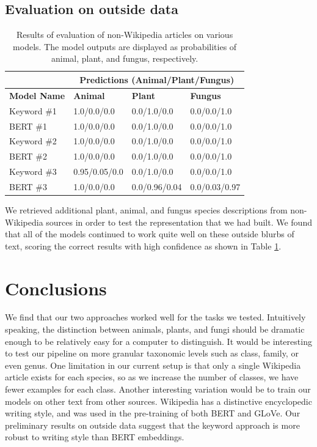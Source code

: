 \documentclass[10pt,twocolumn,letterpaper]{article}
\begin{document}
\subsection{Evaluation on outside data}

\begin{table}
    \centering
    \begin{tabular}{|l|l|l|l|}
    \hline
    \: & \multicolumn{3}{c|}{\bfseries Predictions (Animal/Plant/Fungus)} \\ \hline
    \bfseries Model Name &
    \bfseries Animal &
    \bfseries Plant &
    \bfseries Fungus \\ \hline
Keyword \#1 &
1.0/0.0/0.0 &
0.0/1.0/0.0 &
0.0/0.0/1.0 \\ \hline
BERT \#1 &
1.0/0.0/0.0 &
0.0/1.0/0.0 &
0.0/0.0/1.0 \\ \hline
Keyword \#2 &
1.0/0.0/0.0 &
0.0/1.0/0.0 &
0.0/0.0/1.0 \\ \hline
BERT \#2 &
1.0/0.0/0.0 &
0.0/1.0/0.0 &
0.0/0.0/1.0 \\ \hline
Keyword \#3 &
0.95/0.05/0.0 &
0.0/1.0/0.0 &
0.0/0.0/1.0 \\ \hline
BERT \#3 &
1.0/0.0/0.0 &
0.0/0.96/0.04 &
0.0/0.03/0.97 \\ \hline

    \end{tabular}
    \caption{Results of evaluation of non-Wikipedia articles on various models. The model outputs are displayed as probabilities of animal, plant, and fungus, respectively.}
    \label{fig:evaluation}
\end{table}

We retrieved additional plant, animal, and fungus species descriptions from non-Wikipedia sources in order to test the representation that we had built. We found that all of the models continued to work quite well on these outside blurbs of text, scoring the correct results with high confidence as shown in Table \ref{fig:evaluation}.
\section{Conclusions}
We find that our two approaches worked well for the tasks we tested. Intuitively speaking, the distinction between animals, plants, and fungi should be dramatic enough to be relatively easy for a computer to distinguish. It would be interesting to test our pipeline on more granular taxonomic levels such as class, family, or even genus. One limitation in our current setup is that only a single Wikipedia article exists for each species, so as we increase the number of classes, we have fewer examples for each class. Another interesting variation would be to train our models on other text from other sources. Wikipedia has a distinctive encyclopedic writing style, and was used in the pre-training of both BERT and GLoVe. Our preliminary results on outside data suggest that the keyword approach is more robust to writing style than BERT embeddings. 

{


}
\end{document}
